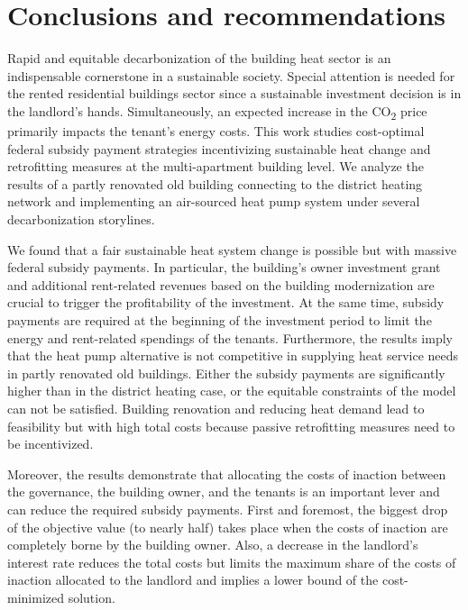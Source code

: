 \section{Conclusions and recommendations}\label{conclusions}
Rapid and equitable decarbonization of the building heat sector is an indispensable cornerstone in a sustainable society. Special attention is needed for the rented residential buildings sector since a sustainable investment decision is in the landlord's hands. Simultaneously, an expected increase in the CO\textsubscript{2} price primarily impacts the tenant's energy costs. This work studies cost-optimal federal subsidy payment strategies incentivizing sustainable heat change and retrofitting measures at the multi-apartment building level. We analyze the results of a partly renovated old building connecting to the district heating network and implementing an air-sourced heat pump system under several decarbonization storylines.\vspace{0.5cm}

We found that a fair sustainable heat system change is possible but with massive federal subsidy payments. In particular, the building's owner investment grant and additional rent-related revenues based on the building modernization are crucial to trigger the profitability of the investment. At the same time, subsidy payments are required at the beginning of the investment period to limit the energy and rent-related spendings of the tenants. Furthermore, the results imply that the heat pump alternative is not competitive in supplying heat service needs in partly renovated old buildings. Either the subsidy payments are significantly higher than in the district heating case, or the equitable constraints of the model can not be satisfied. Building renovation and reducing heat demand lead to feasibility but with high total costs because passive retrofitting measures need to be incentivized.\vspace{0.5cm}

Moreover, the results demonstrate that allocating the costs of inaction between the governance, the building owner, and the tenants is an important lever and can reduce the required subsidy payments. First and foremost, the biggest drop of the objective value (to nearly half) takes place when the costs of inaction are completely borne by the building owner. Also, a decrease in the landlord's interest rate reduces the total costs but limits the maximum share of the costs of inaction allocated to the landlord and implies a lower bound of the cost-minimized solution.\vspace{0.5cm}

